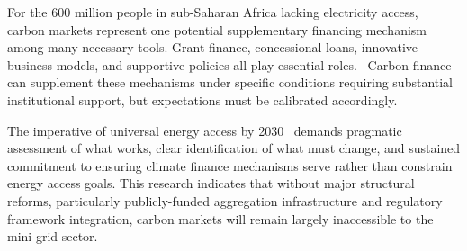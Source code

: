 For the 600 million people in sub-Saharan Africa lacking electricity access,~\cite{iea2023} carbon markets represent one potential supplementary financing mechanism among many necessary tools. Grant finance, concessional loans, innovative business models, and supportive policies all play essential roles.~\cite{esmap2019,tenenbaum2014} Carbon finance can supplement these mechanisms under specific conditions requiring substantial institutional support, but expectations must be calibrated accordingly.

The imperative of universal energy access by 2030~\cite{un2030agenda} demands pragmatic assessment of what works, clear identification of what must change, and sustained commitment to ensuring climate finance mechanisms serve rather than constrain energy access goals. This research indicates that without major structural reforms, particularly publicly-funded aggregation infrastructure and regulatory framework integration, carbon markets will remain largely inaccessible to the mini-grid sector.